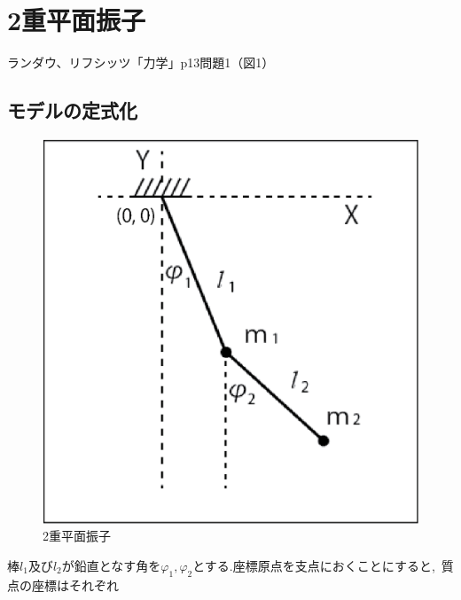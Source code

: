 \chapter{2重平面振子}

ランダウ、リフシッツ「力学」p13問題1（図1）

\section{モデルの定式化}

\begin{figure}[htbp]
  \begin{minipage}[b]{0.45\linewidth}
    \centering
    \includegraphics[keepaspectratio, scale=0.5]{eps/double.eps}
    \caption{2重平面振子}
  \end{minipage}
\end{figure}

棒$l_1$及び$l_2$が鉛直となす角を$\varphi_1,\varphi_2$とする.座標原点を支点におくことにすると, 質点の座標はそれぞれ

